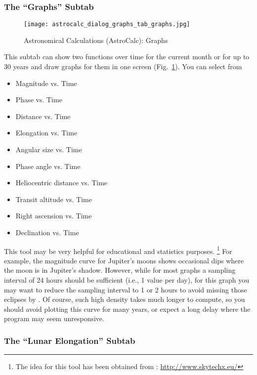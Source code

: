 \subsubsection{The ``Graphs'' Subtab}
\label{sec:gui:AstroCalc:Graphs:Graphs}
    
\begin{figure}[p]
\centering\texttt{[image: astrocalc\_dialog\_graphs\_tab\_graphs.jpg]}
\caption{Astronomical Calculations (AstroCalc): Graphs}
\label{fig:gui:AstroCalc:Graphs:Graphs}
\end{figure}
  
This subtab  can show two functions over time for
the current month or for up to 30 years and draw graphs
for them in one screen (Fig.~\ref{fig:gui:AstroCalc:Graphs:Graphs}).
You can select from
\begin{itemize}
\item Magnitude vs. Time
\item Phase vs. Time
\item Distance vs. Time 
\item Elongation vs. Time 
\item Angular size vs. Time
\item Phase angle vs. Time
\item Heliocentric distance vs. Time
\item Transit altitude vs. Time
\item Right ascension vs. Time
\item Declination vs. Time
\end{itemize}

This tool may be very helpful for educational and statistics purposes.%
	\footnote{The idea for this tool has been obtained from : \url{http://www.skytechx.eu/}}
For example, the magnitude curve for Jupiter's moons shows occasional dips where the moon is in Jupiter's shadow.
However, while for most graphs a sampling interval of 24 hours should be sufficient (i.e., 1 value per day),
for this graph you may want to reduce the sampling interval  to 1 or 2 hours to avoid missing those eclipses by .
Of course, such high density takes much longer to compute, so you should avoid plotting this curve for many years,
or expect a long delay where the program may seem unresponsive.
	
\subsubsection{The ``Lunar Elongation'' Subtab}
\label{sec:gui:AstroCalc:Graphs:LE}

